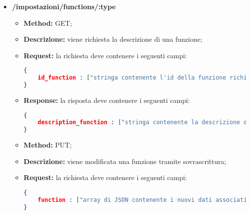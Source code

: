 \begin{itemize}
\item \textbf{/impostazioni/functions/:type}\\

\begin{itemize}
\item \textbf{Method:} GET;
\item \textbf{Descrizione:} viene richiesta la descrizione di una funzione;
\item \textbf{Request:} la richiesta deve contenere i seguenti campi:
\begin{lstlisting}[language=json,firstnumber=1]
{
	id_function : ["stringa contenente l'id della funzione richiesta"]
}
\end{lstlisting}
\item \textbf{Response:} la risposta deve contenere i seguenti campi:
\begin{lstlisting}[language=json,firstnumber=1]
{
	description_function : ["stringa contenente la descrizione della funzione richiesta"]
}
\end{lstlisting}
\end{itemize}

\begin{itemize}
\item \textbf{Method:} PUT;
\item \textbf{Descrizione:} viene modificata una funzione tramite sovrascrittura;
\item \textbf{Request:} la richiesta deve contenere i seguenti campi:
\begin{lstlisting}[language=json,firstnumber=1]
{
	function : ["array di JSON contenente i nuovi dati associati alla funzione da modificare"]
}
\end{lstlisting}

\end{itemize}

\end{itemize}



